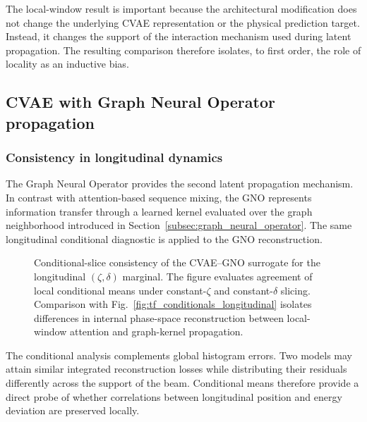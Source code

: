 The local-window result is important because the architectural modification does not change the underlying CVAE representation or the physical prediction target. Instead, it changes the support of the interaction mechanism used during latent propagation. The resulting comparison therefore isolates, to first order, the role of locality as an inductive bias.

\subsection{CVAE with Graph Neural Operator propagation}
\label{subsec:results_cvae_gno}

\subsubsection{Consistency in longitudinal dynamics}
\label{subsubsec:gno_longitudinal_conditionals}

The Graph Neural Operator provides the second latent propagation mechanism. In contrast with attention-based sequence mixing, the GNO represents information transfer through a learned kernel evaluated over the graph neighborhood introduced in Section~\ref{subsec:graph_neural_operator}. The same longitudinal conditional diagnostic is applied to the GNO reconstruction.

\begin{figure}[h!]
\centering
{}
\caption{
Conditional-slice consistency of the CVAE--GNO surrogate for the longitudinal \((\zeta,\delta)\) marginal. The figure evaluates agreement of local conditional means under constant-\(\zeta\) and constant-\(\delta\) slicing. Comparison with Fig.~\ref{fig:tf_conditionals_longitudinal} isolates differences in internal phase-space reconstruction between local-window attention and graph-kernel propagation.
}
\label{fig:gno_conditionals_longitudinal}
\end{figure}

The conditional analysis complements global histogram errors. Two models may attain similar integrated reconstruction losses while distributing their residuals differently across the support of the beam. Conditional means therefore provide a direct probe of whether correlations between longitudinal position and energy deviation are preserved locally.

